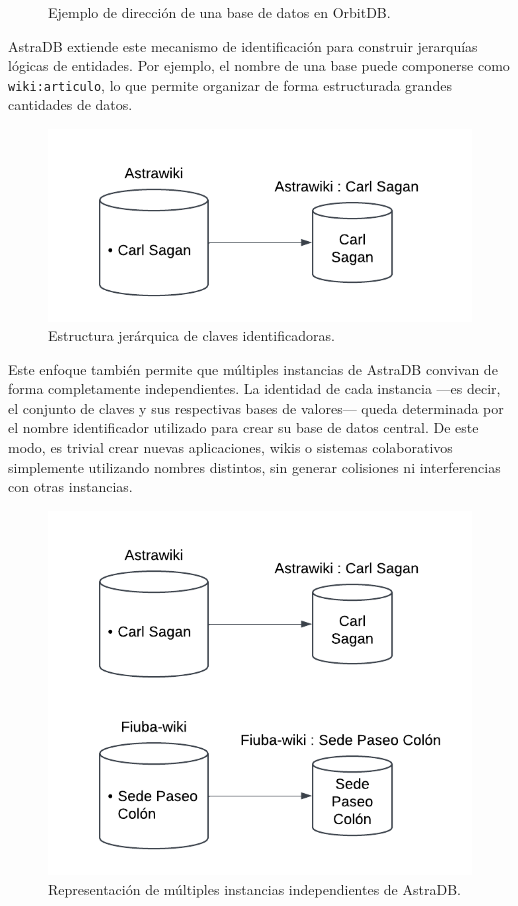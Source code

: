 \begin{figure}[H]
\centering
{}
\caption{Ejemplo de dirección de una base de datos en OrbitDB.}
\end{figure}

AstraDB extiende este mecanismo de identificación para construir jerarquías lógicas de entidades. Por ejemplo, el nombre de una base puede componerse como \texttt{wiki:articulo}, lo que permite organizar de forma estructurada grandes cantidades de datos.

\begin{figure}[H]
\centering
\includegraphics[width=0.6\linewidth]{img/solucion-ipfs/bdd-names.png}
\caption{Estructura jerárquica de claves identificadoras.}
\label{fig:bdd-names}
\end{figure}

Este enfoque también permite que múltiples instancias de AstraDB convivan de forma completamente independientes. La identidad de cada instancia —es decir, el conjunto de claves y sus respectivas bases de valores— queda determinada por el nombre identificador utilizado para crear su base de datos central. De este modo, es trivial crear nuevas aplicaciones, wikis o sistemas colaborativos simplemente utilizando nombres distintos, sin generar colisiones ni interferencias con otras instancias.

\begin{figure}[H]
\centering
\includegraphics[width=0.6\linewidth]{img/solucion-ipfs/bdd-multiple.png}
\caption{Representación de múltiples instancias independientes de AstraDB.}
\label{fig:bdd-multiple}
\end{figure}

